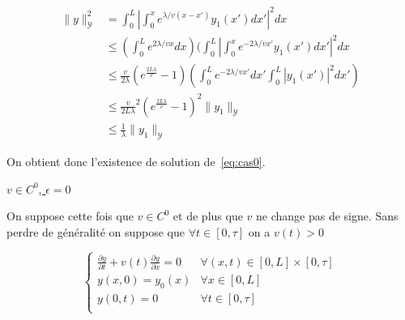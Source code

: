 \documentclass[a4paper]{article}
\begin{document}
\begin{preuve}
\[
\begin{split}
	\|y\|_{\mathscr{Y}}^2 &= \int_0^L |\int_0^x e^{\lambda/v (x-x')}y_1(x')dx' |^2 dx \\
                        & \leq (\int_0^L e^{2 \lambda/v x} dx) (\int_0^L |\int_0^x e^{-2\lambda/v x'} y_1(x') dx' |^2 dx \\
						& \leq \frac{v}{2 \lambda}(e^{\frac{2L\lambda}{v}}-1) (\int_0^L e^{-2\lambda/v x'}dx' \int_0^L |y_1(x')|^2 dx') \\
						& \leq \frac{v}{2 L \lambda}^2(e^{\frac{2L\lambda}{v}}-1)^2 \|y_1 \|_{\mathscr{Y}} \\
						& \leq \frac{1}{\lambda} \|y_1 \|_{\mathscr{Y}} 
\end{split}
\]
	
\end{preuve}

On obtient donc l'existence de solution de~\eqref{eq:cas0}.

\underline{$v \in C^0$, $\epsilon = 0$}

On suppose cette fois que $v \in C^0$ et de plus que $v$ ne change pas de signe. 
Sans perdre de généralité on suppose que $\forall t \in [0,\tau]$ on a $v(t)>0$

\begin{equation}
\label{eq:cas0}
\begin{cases}
 \displaystyle \frac{\partial y}{\partial t}
 + v(t) \frac{\partial y} {\partial x}  
 = 0  & \forall (x,t) \in [0,L] \times [0, \tau]\\
 y(x,0) = y_{0} (x) & \forall x \in [0,L] \\
 y(0,t) = 0 & \forall t \in [0,\tau] \\
\end{cases}
\end{equation}
\end{document}
